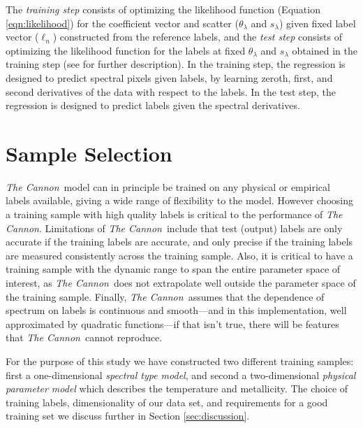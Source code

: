 \documentclass[twocolumn]{aastex62}
\newcommand{\thecannon}{\textsl{The Cannon}}
\begin{document}
The \emph{training step} consists of optimizing the likelihood function (Equation \ref{eqn:likelihood}) for the coefficient vector and scatter ($\theta_{\lambda}$ and $s_{\lambda}$) given fixed label vector (\emph{$\ell_n$}) constructed from the reference labels, and the \emph{test step} consists of optimizing the likelihood function for the labels at fixed $\theta_{\lambda}$ and $s_{\lambda}$ obtained in the training step (see \citealt{Ness:2015} for further description). 
In the training step, the regression is designed to predict spectral pixels
given labels, by learning zeroth, first, and second derivatives of the data with respect to
the labels. In the test step, the regression is designed to predict labels given the spectral
derivatives. \\
 

\section{Sample Selection} \label{sec:sample_selection}

\thecannon\ model can in principle be trained on any physical or empirical labels available, giving a wide range of flexibility to the model. However choosing a training sample with high quality labels is critical to the performance of \thecannon.
Limitations of \thecannon\ include that test (output) labels are only accurate if the training labels are accurate, and only precise if the training labels are measured consistently across the training sample.
Also, it is critical to have a training sample with the dynamic range to span the entire parameter space of interest, as \thecannon\ does not extrapolate well outside the parameter space of the training sample.
Finally, \thecannon\ assumes that the dependence of spectrum on labels is continuous and smooth---and in this implementation, well approximated by quadratic functions---if that isn't true, there will be features that \thecannon\ cannot reproduce.

For the purpose of this study we have constructed two different training samples: first a one-dimensional \emph{spectral type model}, and second a two-dimensional \emph{physical parameter model} which describes the temperature and metallicity. The choice of training labels, dimensionality of our data set, and requirements for a good training set we discuss further in Section \ref{sec:discussion}.

\end{document}
